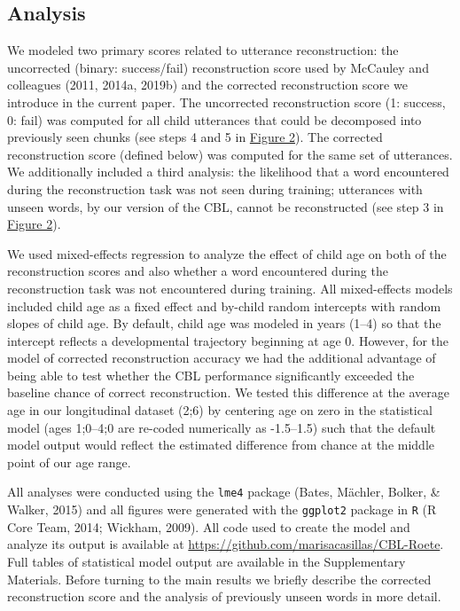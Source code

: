 \documentclass[
  english,
  man,mask,floatsintext]{apa6}
\begin{document}
\hypertarget{analysis}{%
\subsection{Analysis}\label{analysis}}

We modeled two primary scores related to utterance reconstruction: the uncorrected (binary: success/fail) reconstruction score used by McCauley and colleagues (2011, 2014a, 2019b) and the corrected reconstruction score we introduce in the current paper. The uncorrected reconstruction score (1: success, 0: fail) was computed for all child utterances that could be decomposed into previously seen chunks (see steps 4 and 5 in \protect\hyperlink{fig2}{Figure 2}). The corrected reconstruction score (defined below) was computed for the same set of utterances. We additionally included a third analysis: the likelihood that a word encountered during the reconstruction task was not seen during training; utterances with unseen words, by our version of the CBL, cannot be reconstructed (see step 3 in \protect\hyperlink{fig2}{Figure 2}).

We used mixed-effects regression to analyze the effect of child age on both of the reconstruction scores and also whether a word encountered during the reconstruction task was not encountered during training. All mixed-effects models included child age as a fixed effect and by-child random intercepts with random slopes of child age. By default, child age was modeled in years (1--4) so that the intercept reflects a developmental trajectory beginning at age 0. However, for the model of corrected reconstruction accuracy we had the additional advantage of being able to test whether the CBL performance significantly exceeded the baseline chance of correct reconstruction. We tested this difference at the average age in our longitudinal dataset (2;6) by centering age on zero in the statistical model (ages 1;0--4;0 are re-coded numerically as -1.5--1.5) such that the default model output would reflect the estimated difference from chance at the middle point of our age range.

All analyses were conducted using the \texttt{lme4} package (Bates, Mächler, Bolker, \& Walker, 2015) and all figures were generated with the \texttt{ggplot2} package in \texttt{R} (R Core Team, 2014; Wickham, 2009). All code used to create the model and analyze its output is available at \href{}{https://github.com/marisacasillas/CBL-Roete}. Full tables of statistical model output are available in the Supplementary Materials. Before turning to the main results we briefly describe the corrected reconstruction score and the analysis of previously unseen words in more detail.
\end{document}

